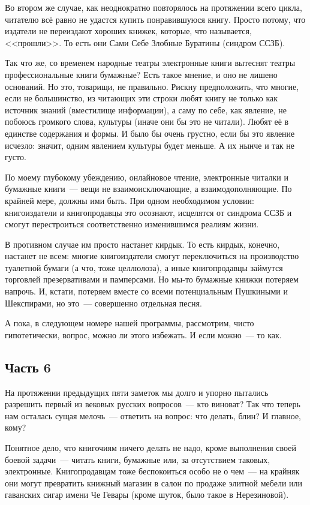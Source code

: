 Во втором же случае, как неоднократно повторялось на протяжении всего цикла, читателю всё равно не удастся купить понравившуюся книгу. Просто потому, что издатели не переиздают хороших книжек, которые, что называется, <<прошли>>. То есть они Сами Себе Злобные Буратины (синдром ССЗБ).

Так что же, со временем народные театры электронные книги вытеснят театры профессиональные книги бумажные? Есть такое мнение, и оно не лишено оснований. Но это, товарищи, не правильно. Рискну предположить, что многие, если не большинство, из читающих эти строки любят книгу не только как источник знаний (вместилище информации), а саму по себе, как явление, не побоюсь громкого слова, культуры (иначе они бы это не читали). Любят её в единстве содержания и формы. И было бы очень грустно, если бы это явление исчезло: значит, одним явлением культуры будет меньше. А их нынче и так не густо.

По моему глубокому убеждению, онлайновое чтение, электронные читалки и бумажные книги~--- вещи не взаимоисключающие, а взаимодополняющие. По крайней мере, должны ими быть. При одном необходимом условии: книгоиздатели и книгопродавцы это осознают, исцелятся от синдрома ССЗБ и смогут перестроиться соответственно изменившимся реалиям жизни.

В противном случае им просто настанет кирдык. То есть кирдык, конечно, настанет не всем: многие книгоиздатели смогут переключиться на производство туалетной бумаги (а что, тоже целлюлоза), а иные книгопродавцы займутся торговлей презервативами и памперсами. Но мы-то бумажные книжки потеряем напрочь. И, кстати, потеряем вместе со всеми потенциальным Пушкиными и Шекспирами, но это~--- совершенно отдельная песня.

А пока, в следующем номере нашей программы, рассмотрим, чисто гипотетически, вопрос, можно ли этого избежать. И если можно~--- то как.

\subsection{Часть 6}
На протяжении предыдущих пяти заметок мы долго и упорно пытались разрешить первый из вековых русских вопросов~--- кто виноват? Так что теперь нам осталась сущая мелочь~--- ответить на вопрос: что делать, блин? И главное, кому?

Понятное дело, что книгочиям ничего делать не надо, кроме выполнения своей боевой задачи~--- читать книги, бумажные или, за отсутствием таковых, электронные. Книгопродавцам тоже беспокоиться особо не о чем~--- на крайняк они могут превратить книжный магазин в салон по продаже элитной мебели или гаванских сигар имени Че Гевары (кроме шуток, было такое в Нерезиновой).

